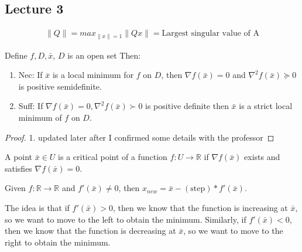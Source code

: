 
% 
\subsection{Lecture 3}

\begin{definition}
    \begin{align*}
        \|Q\|=max_{\|x\|=1}\|Qx\|= \text{Largest singular value of A}
    \end{align*}
\end{definition}

\begin{definition}[]
    Define $f,D,\bar{x}$, $D$ is an open set
    Then:
    \begin{enumerate}
        \item Nec: If $\bar{x}$ is a local minimum for $f$ on $D$, then $\nabla f(\bar{x})=0$ and $\nabla^2f(\bar{x}) \succeq 0
        $ is positive semidefinite.
        \item Suff: If $\nabla f(\bar{x})=0,\nabla^2f(\bar{x}) \succ 0
        $ is positive definite then $\bar{x}$ is a strict local minimum of $f$ on $D$.
    \end{enumerate}
\end{definition}
\begin{proof}
    1. updated later after I confirmed some details with the professor
\end{proof}

\begin{definition}
    A point $\bar x \in U$ is a critical point of a function $f: U \rightarrow \mathbb R$ if $\nabla f(\bar x)$ exists and satisfies $\nabla f(\bar x) = 0$.
\end{definition}

\begin{problem}
    Given $f: \mathbb{R}\rightarrow \mathbb{R}$ and $f'(\bar{x})\neq 0$, then $x_{new}=\bar{x}-(\text{step})*f'(\bar{x})$.
    
    The idea is that if $f'(\bar x) > 0$, then we know that the function is increasing at $\bar x$, so we want to move to the left to obtain the minimum. Similarly, if $f'(\bar x) < 0$, then we know that the function is decreasing at $\bar x$, so we want to move to the right to obtain the minimum.
\end{problem}

